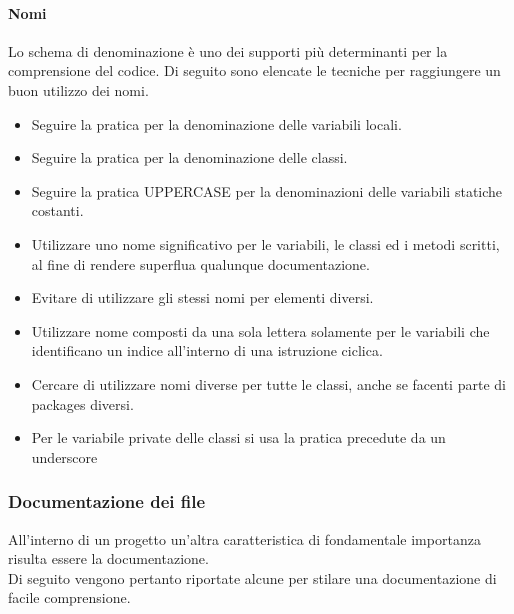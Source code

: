 \paragraph{Nomi}
Lo schema di denominazione è uno dei supporti più determinanti per la comprensione del codice.
Di seguito sono elencate le tecniche per raggiungere un buon utilizzo dei nomi.

\begin{itemize}
\item Seguire la pratica  per la denominazione delle variabili locali.
\item Seguire la pratica  per la denominazione delle classi.
\item Seguire la pratica UPPER\textunderscore CASE per la denominazioni delle variabili statiche costanti.
\item Utilizzare uno nome significativo per le variabili, le classi ed i metodi scritti, al fine di rendere superflua qualunque documentazione.
\item Evitare di utilizzare gli stessi nomi per elementi diversi.
\item Utilizzare nome composti da una sola lettera solamente per le variabili che identificano un indice all'interno di una istruzione ciclica.
\item Cercare di utilizzare nomi diverse per tutte le classi, anche se facenti parte di packages diversi.
\item Per le variabile private delle classi si usa la pratica  precedute da un underscore 
\end{itemize}

\subsubsection{Documentazione dei file}
All'interno di un progetto  un'altra caratteristica di fondamentale importanza risulta essere la documentazione. \\
Di seguito vengono pertanto riportate alcune  per stilare una documentazione di facile comprensione.

